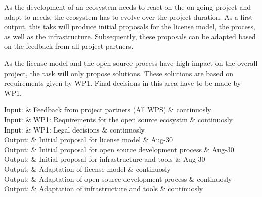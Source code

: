 \documentclass{template/openetcs_article}
\begin{document}
As the development of an ecosystem needs to react on the on-going project and adapt to needs, the ecosystem has to evolve over the project duration. As a first output, this taks will produce initial proposals for the license model, the process, as well as the infrastructure. Subsequently, these proposals can be adapted based on the feedback from all project partners.

As the license model and the open source process have high impact on the overall project, the task will only propose solutions. These solutions are based on requirements given by WP1. Final decisions in this area have to be made by WP1. 

\begin{inoutput}
Input: & Feedback from project partners (All WPS) & continuosly \\
Input: & WP1: Requirements for the open source ecosystm & continuosly \\
Input: & WP1: Legal decisions & continuosly \\
Output: & Initial proposal for license model & Aug-30 \\
Output: & Initial proposal for open source development process & Aug-30 \\
Output: & Initial proposal for infrastructure and tools & Aug-30 \\
Output: & Adaptation of license model & continuosly \\
Output: & Adaptation of open source development process & continuosly \\
Output: & Adaptation of infrastructure and tools & continuosly \\
\end{inoutput}
\end{document}
